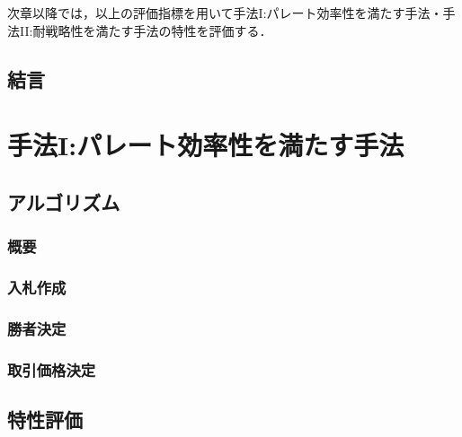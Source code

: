 次章以降では，以上の評価指標を用いて手法I:パレート効率性を満たす手法・手法II:耐戦略性を満たす手法の特性を評価する．

\hypertarget{ux7d50ux8a00}{%
\section{結言}\label{ux7d50ux8a00}}

\hypertarget{ux624bux6cd5iux30d1ux30ecux30fcux30c8ux52b9ux7387ux6027ux3092ux6e80ux305fux3059ux624bux6cd5}{%
\chapter{手法I:パレート効率性を満たす手法}\label{ux624bux6cd5iux30d1ux30ecux30fcux30c8ux52b9ux7387ux6027ux3092ux6e80ux305fux3059ux624bux6cd5}}

\hypertarget{ux30a2ux30ebux30b4ux30eaux30baux30e0}{%
\section{アルゴリズム}\label{ux30a2ux30ebux30b4ux30eaux30baux30e0}}

\hypertarget{ux6982ux8981}{%
\subsection{概要}\label{ux6982ux8981}}

\hypertarget{ux5165ux672dux4f5cux6210}{%
\subsection{入札作成}\label{ux5165ux672dux4f5cux6210}}

\hypertarget{ux52ddux8005ux6c7aux5b9a}{%
\subsection{勝者決定}\label{ux52ddux8005ux6c7aux5b9a}}

\hypertarget{ux53d6ux5f15ux4fa1ux683cux6c7aux5b9a}{%
\subsection{取引価格決定}\label{ux53d6ux5f15ux4fa1ux683cux6c7aux5b9a}}

\hypertarget{ux7279ux6027ux8a55ux4fa1}{%
\section{特性評価}\label{ux7279ux6027ux8a55ux4fa1}}

